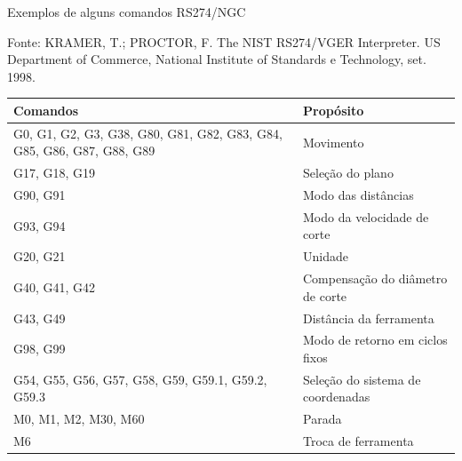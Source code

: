 \documentclass[aspectratio=169]{beamer}
\begin{document}
{\begin{frame}{Exemplos de alguns comandos RS274/NGC}

  \scriptsize{Fonte: KRAMER, T.; PROCTOR, F. 
    The NIST RS274/VGER Interpreter. US Department of
    Commerce, National Institute of Standards e Technology, set. 1998.}

  \begin{table}[H]
    \centering
    \begin{tabular}{p{7cm}|p{5cm}}
    
      \hline
      \bfseries{\scriptsize{Comandos}} & \bfseries{\scriptsize{Prop\'osito}} \\
  
      \hline
      \scriptsize{G0, G1, G2, G3, G38, G80, G81, G82, G83, G84, G85, G86, G87, G88, G89} 
      & \scriptsize{Movimento} \\
  
      \hline
      \scriptsize{G17, G18, G19} 
      & \scriptsize{Sele\c c\~ao do plano} \\
  
      \hline
      \scriptsize{G90, G91}
      & \scriptsize{Modo das dist\^ancias} \\
  
      \hline
      \scriptsize{G93, G94}
      & \scriptsize{Modo da velocidade de corte} \\
  
      \hline
      \scriptsize{G20, G21}
      & \scriptsize{Unidade} \\
  
      \hline
      \scriptsize{G40, G41, G42}
      & \scriptsize{Compensa\c c\~ao do di\^ametro de corte} \\
  
      \hline
      \scriptsize{G43, G49}
      & \scriptsize{Dist\^ancia da ferramenta} \\
  
      \hline
      \scriptsize{G98, G99}
      & \scriptsize{Modo de retorno em ciclos fixos} \\
  
      \hline
      \scriptsize{G54, G55, G56, G57, G58, G59, G59.1, G59.2, G59.3}
      & \scriptsize{Sele\c c\~ao do sistema de coordenadas} \\
  
      \hline
      \scriptsize{M0, M1, M2, M30, M60}
      & \scriptsize{Parada} \\
  
      \hline
      \scriptsize{M6}
      & \scriptsize{Troca de ferramenta} \\
  

\end{tabular}
\end{table}
\end{frame}}
\end{document}
